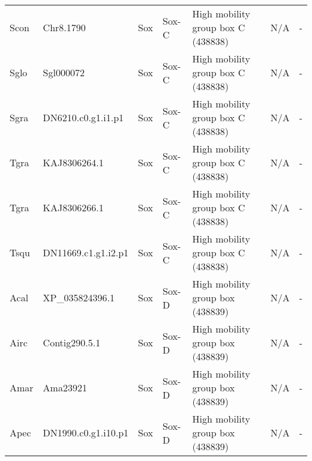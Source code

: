 \documentclass[../main.tex]{subfiles}
\begin{document}
\begin{landscape}
\begin{longtable}{lllllll}
		Scon           & Chr8.1790             & Sox            & Sox-C               & High mobility group box C (438838)          & N/A                                                                    & -                    \\
		Sglo           & Sgl000072             & Sox            & Sox-C               & High mobility group box C (438838)          & N/A                                                                    & -                    \\
		Sgra           & DN6210.c0.g1.i1.p1    & Sox            & Sox-C               & High mobility group box C (438838)          & N/A                                                                    & -                    \\
		Tgra           & KAJ8306264.1          & Sox            & Sox-C               & High mobility group box C (438838)          & N/A                                                                    & -                    \\
		Tgra           & KAJ8306266.1          & Sox            & Sox-C               & High mobility group box C (438838)          & N/A                                                                    & -                    \\
		Tsqu           & DN11669.c1.g1.i2.p1   & Sox            & Sox-C               & High mobility group box C (438838)          & N/A                                                                    & -                    \\
		Acal           & XP\_035824396.1       & Sox            & Sox-D               & High mobility group box (438839)            & N/A                                                                    & -                    \\
		Airc           & Contig290.5.1         & Sox            & Sox-D               & High mobility group box (438839)            & N/A                                                                    & -                    \\
		Amar           & Ama23921              & Sox            & Sox-D               & High mobility group box (438839)            & N/A                                                                    & -                    \\
		Apec           & DN1990.c0.g1.i10.p1   & Sox            & Sox-D               & High mobility group box (438839)            & N/A                                                                    & -                    \\

\end{longtable}
\end{landscape}
\end{document}
